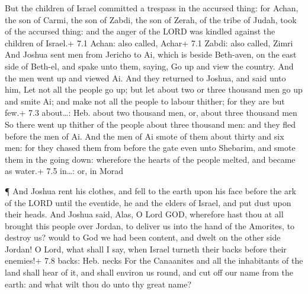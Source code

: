  But the children of Israel committed a trespass in the
accursed thing: for Achan, the son of Carmi, the son of Zabdi, the son
of Zerah, of the tribe of Judah, took of the accursed thing: and the
anger of the LORD was kindled against the children of Israel.+ 7.1
Achan: also called, Achar+ 7.1 Zabdi: also called, Zimri 
And Joshua sent men from Jericho to Ai, which is beside Beth-aven, on
the east side of Beth-el, and spake unto them, saying, Go up and view
the country. And the men went up and viewed Ai.  And they
returned to Joshua, and said unto him, Let not all the people go up; but
let about two or three thousand men go up and smite Ai; and make not all
the people to labour thither; for they are but few.+ 7.3 about\ldots:
Heb. about two thousand men, or, about three thousand men 
So there went up thither of the people about three thousand men: and
they fled before the men of Ai.  And the men of Ai smote of
them about thirty and six men: for they chased them from before the gate
even unto Shebarim, and smote them in the going down: wherefore the
hearts of the people melted, and became as water.+ 7.5 in\ldots: or, in
Morad

 ¶ And Joshua rent his clothes, and fell to the earth upon
his face before the ark of the LORD until the eventide, he and the
elders of Israel, and put dust upon their heads.  And Joshua
said, Alas, O Lord GOD, wherefore hast thou at all brought this people
over Jordan, to deliver us into the hand of the Amorites, to destroy us?
would to God we had been content, and dwelt on the other side Jordan!
 O Lord, what shall I say, when Israel turneth their backs
before their enemies!+ 7.8 backs: Heb. necks  For the
Canaanites and all the inhabitants of the land shall hear of it, and
shall environ us round, and cut off our name from the earth: and what
wilt thou do unto thy great name?

